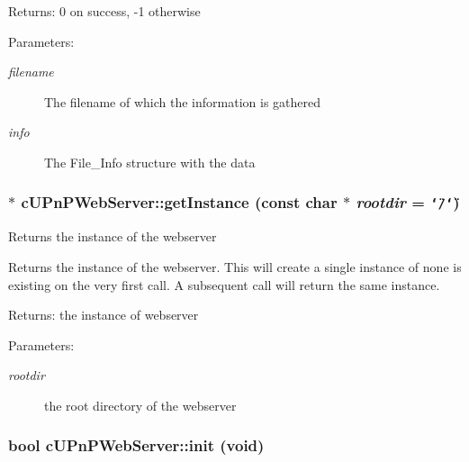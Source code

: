 \begin{Desc}
\item[Returns:]0 on success, -1 otherwise \end{Desc}
\begin{Desc}
\item[Parameters:]
\begin{description}
\item[{\em filename}]The filename of which the information is gathered \item[{\em info}]The File\_\-Info structure with the data \end{description}
\end{Desc}
\hypertarget{classcUPnPWebServer_59fb8d378eae0193665b51fdda5a4da0}{
\subsubsection[{getInstance}]{ $\ast$ cUPnPWebServer::getInstance (const char $\ast$ {\em rootdir} = {\tt \char`\"{}/\char`\"{}})}}
\label{classcUPnPWebServer_59fb8d378eae0193665b51fdda5a4da0}


Returns the instance of the webserver

Returns the instance of the webserver. This will create a single instance of none is existing on the very first call. A subsequent call will return the same instance.

\begin{Desc}
\item[Returns:]the instance of webserver \end{Desc}
\begin{Desc}
\item[Parameters:]
\begin{description}
\item[{\em rootdir}]the root directory of the webserver \end{description}
\end{Desc}
\hypertarget{classcUPnPWebServer_a374ec8a84405fb2ee16dc00ba0218f5}{
\subsubsection[{init}]{\setlength{\rightskip}{0pt plus 5cm}bool cUPnPWebServer::init (void)}}
\label{classcUPnPWebServer_a374ec8a84405fb2ee16dc00ba0218f5}


